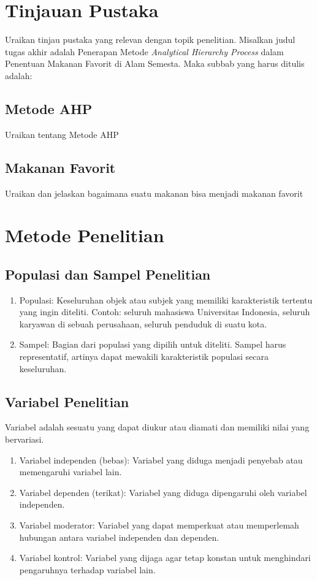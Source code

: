 \documentclass[english,12pt,a4paper]{book}
\begin{document}
\chapter{Tinjauan Pustaka}
Uraikan tinjau pustaka yang relevan dengan topik penelitian. Misalkan judul tugas akhir adalah Penerapan Metode \textit{Analytical Hierarchy Process} dalam Penentuan Makanan Favorit di Alam Semesta. Maka subbab yang harus ditulis adalah:
\section{Metode AHP}
Uraikan tentang Metode AHP
\section{Makanan Favorit}
Uraikan dan jelaskan bagaimana suatu makanan bisa menjadi makanan favorit

\chapter{Metode Penelitian} 
\section{Populasi dan Sampel Penelitian}
\begin{enumerate}
	\item Populasi: Keseluruhan objek atau subjek yang memiliki karakteristik tertentu yang ingin diteliti. Contoh: seluruh mahasiswa Universitas Indonesia, seluruh karyawan di sebuah perusahaan, seluruh penduduk di suatu kota.
	\item Sampel: Bagian dari populasi yang dipilih untuk diteliti. Sampel harus representatif, artinya dapat mewakili karakteristik populasi secara keseluruhan.
\end{enumerate}
\section{Variabel Penelitian}
Variabel adalah sesuatu yang dapat diukur atau diamati dan memiliki nilai yang bervariasi.
\begin{enumerate}
	\item Variabel independen (bebas): Variabel yang diduga menjadi penyebab atau memengaruhi variabel lain.
	\item Variabel dependen (terikat): Variabel yang diduga dipengaruhi oleh variabel independen.
	\item Variabel moderator: Variabel yang dapat memperkuat atau memperlemah hubungan antara variabel independen dan dependen.
	\item Variabel kontrol: Variabel yang dijaga agar tetap konstan untuk menghindari pengaruhnya terhadap variabel lain.
\end{enumerate}
\end{document}
